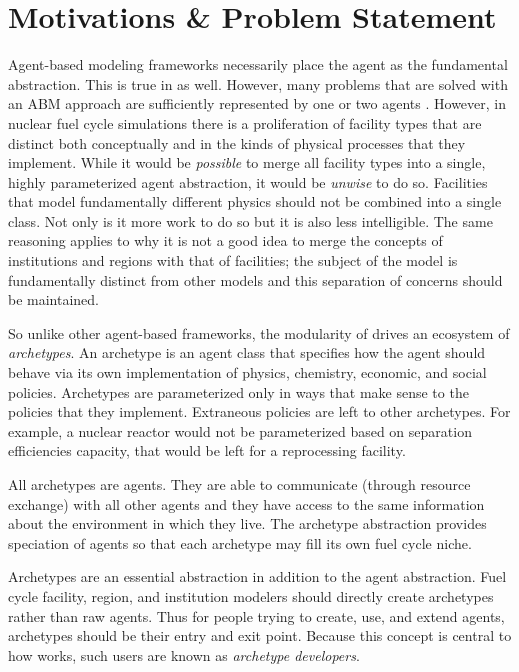 \section{Motivations \& Problem Statement}
\label{sec-motive}

Agent-based modeling frameworks necessarily place the agent as the fundamental 
abstraction. This is true in \cyclus as well. However, many problems that are 
solved with an \gls{ABM} approach are sufficiently represented by one or two 
agents \cite{taylor2014agent}. However, in nuclear fuel cycle simulations there is
a proliferation of facility types that are distinct both conceptually and in the 
kinds of physical processes that they implement. While it would be \emph{possible}
to merge all facility types into a single, highly parameterized agent abstraction,
it would be \emph{unwise} to do so. Facilities that model fundamentally different
physics should not be combined into a single class. Not only is it more work to 
do so but it is also less intelligible. The same reasoning applies to why it is 
not a good idea to merge the concepts of institutions and regions with that of
facilities; the subject of the model is fundamentally distinct from other models
and this separation of concerns should be maintained.

So unlike other agent-based frameworks, the modularity of \cyclus drives 
an ecosystem of \emph{archetypes}. An archetype is an agent class that specifies 
how the agent should behave via its own implementation of physics, chemistry, 
economic, and social policies. Archetypes are parameterized only in ways that 
make sense to the policies that they implement. Extraneous policies are left to 
other archetypes. For example, a nuclear reactor would not be parameterized based 
on separation efficiencies capacity, that would be left for a reprocessing facility.

All archetypes are agents. They are able to communicate (through resource 
exchange) with all other agents and they have access to the same information 
about the environment in which they live. The archetype abstraction provides
speciation of agents so that each archetype may fill its own fuel cycle niche.

Archetypes are an essential abstraction in addition to the agent abstraction. 
Fuel cycle facility, region, and institution modelers should directly create
archetypes rather than raw agents. Thus for people trying to create, use, and 
extend \cyclus agents, archetypes should be their entry and exit point. Because this 
concept is central to how \cyclus works, such users are known as \emph{archetype
developers}.

